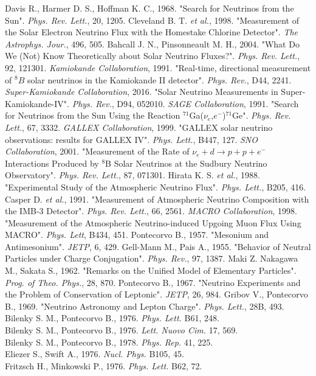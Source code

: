 \documentclass[english]{article}
\begin{document}
\begin{thebibliography}{99}
    Davis R., Harmer D. S., Hoffman K. C., 1968. "Search for Neutrinos from the Sun". \textit{Phys. Rev. Lett.}, 20, 1205.
    Cleveland B. T. \textit{et al.}, 1998. "Measurement of the Solar Electron Neutrino Flux with the Homestake Chlorine Detector". \textit{The Astrophys. Jour.}, 496, 505.
    Bahcall J. N., Pinsonneault M. H., 2004. "What Do We (Not) Know Theoretically about Solar Neutrino Fluxes?". \textit{Phys. Rev. Lett.}, 92, 121301.
    \textit{Kamiokande Collaboration}, 1991. "Real-time, directional measurement of ${}^{8} B$ solar neutrinos in the Kamiokande II detector". \textit{Phys. Rev.}, D44, 2241.
    \textit{Super-Kamiokande Collaboration}, 2016. "Solar Neutrino Measurements in Super-Kamiokande-IV". \textit{Phys. Rev.}, D94, 052010.
    \textit{SAGE Collaboration}, 1991. "Search for Neutrinos from the Sun Using the Reaction ${}^{71}$Ga($\nu_{e}$,$e^{-}$)${}^{71}$Ge". \textit{Phys. Rev. Lett.}, 67, 3332.
    \textit{GALLEX Collaboration}, 1999. "GALLEX solar neutrino observations: results for GALLEX IV". \textit{Phys. Lett.}, B447, 127.
    \textit{SNO Collaboration}, 2001. "Measurement of the Rate of $\nu_{e} +d \rightarrow p+p+e^{-}$ Interactions Produced by ${}^{8}$B Solar Neutrinos at the Sudbury Neutrino Observatory". \textit{Phys. Rev. Lett.}, 87, 071301.
    Hirata K. S. \textit{et al.}, 1988. "Experimental Study of the Atmospheric Neutrino Flux". \textit{Phys. Lett.}, B205, 416.
    Casper D. \textit{et al.}, 1991. "Measurement of Atmospheric Neutrino Composition with the IMB-3 Detector". \textit{Phys. Rev. Lett.}, 66, 2561.
    \textit{MACRO Collaboration}, 1998. "Measurement of the Atmospheric Neutrino-induced Upgoing Muon Flux Using MACRO". \textit{Phys. Lett}, B434, 451.
    Pontecorvo B., 1957. "Mesonium and Antimesonium". \textit{JETP}, 6, 429.
    Gell-Mann M., Pais A., 1955. "Behavior of Neutral Particles under Charge Conjugation". \textit{Phys. Rev.}, 97, 1387.
    Maki Z. Nakagawa M., Sakata S., 1962. "Remarks on the Unified Model of Elementary Particles". \textit{Prog. of Theo. Phys.}, 28, 870.
    Pontecorvo B., 1967. "Neutrino Experiments and the Problem of Conservation of Leptonic". \textit{JETP}, 26, 984.
    Gribov V., Pontecorvo B., 1969. "Neutrino Astronomy and Lepton Charge". \textit{Phys. Lett.}, 28B, 493.
    Bilenky S. M., Pontecorvo B., 1976. \textit{Phys. Lett.} B61, 248.\\
    Bilenky S. M., Pontecorvo B., 1976. \textit{Lett. Nuovo Cim.} 17, 569.\\ 
    Bilenky S. M., Pontecorvo B., 1978. \textit{Phys. Rep.} 41, 225.\\
    Eliezer S., Swift A., 1976. \textit{Nucl. Phys.} B105, 45.\\
    Fritzsch H., Minkowski P., 1976. \textit{Phys. Lett.} B62, 72.
    
\end{thebibliography}
\end{document}
